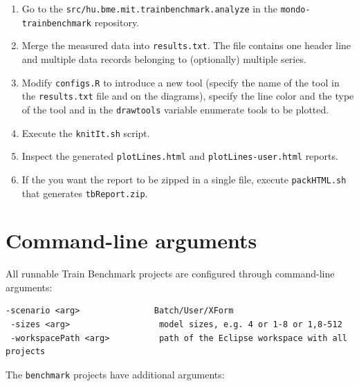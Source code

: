 \begin{enumerate}
  \item Go to the \texttt{src/hu.bme.mit.trainbenchmark.analyze} in the \texttt{mondo-trainbenchmark} repository.
  \item Merge the measured data into \texttt{results.txt}. The file contains one header line and multiple data records belonging to (optionally) multiple series.
  \item Modify \texttt{configs.R} to introduce a new tool (specify the name of the tool in the \texttt{results.txt} file and on the diagrams), specify the line color and the type of the tool and in the \texttt{drawtools} variable enumerate tools to be plotted.
  \item Execute the \texttt{knitIt.sh} script.
  \item Inspect the generated \texttt{plotLines.html} and \texttt{plotLines-user.html} reports.
  \item If the you want the report to be zipped in a single file, execute \texttt{packHTML.sh} that generates \texttt{tbReport.zip}.
\end{enumerate}

\section{Command-line arguments}

All runnable Train Benchmark projects are configured through command-line arguments:

\begin{lstlisting}[keywordstyle=\ttfamily]
 -scenario <arg>               Batch/User/XForm
 -sizes <arg>                  model sizes, e.g. 4 or 1-8 or 1,8-512
 -workspacePath <arg>          path of the Eclipse workspace with all projects
\end{lstlisting}

The \texttt{benchmark} projects have additional arguments:

